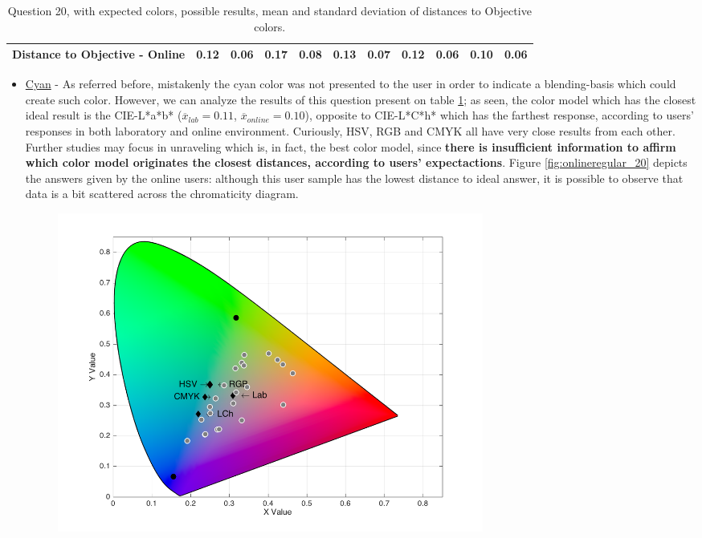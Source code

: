 \begin{table}[!htbp]
{\begin{tabular}{lccccccccccccc}
    \multicolumn{4}{l|}{Distance to Objective - Online}                                                                                                                & 0.12                  & \multicolumn{1}{c|}{0.06}          & 0.17                  & \multicolumn{1}{c|}{0.08}          & 0.13                 & \multicolumn{1}{c|}{0.07}          & 0.12                 & \multicolumn{1}{c|}{0.06}          & \textbf{0.10}         & \multicolumn{1}{c|}{0.06}         \\ \hline
  \end{tabular}}
  \caption[Question 20, with expected Results.]{Question 20, with expected colors, possible results, mean and standard deviation of distances to Objective colors.}
  \label{table:lab_q20_expected}
\end{table}
%
\begin{itemize}
  \item \ul{Cyan} - As referred before, mistakenly the cyan color was not presented to the user in order to indicate a blending-basis which could create such color. However, we can analyze the results of
  this question present on table \ref{table:lab_q20_expected}; as seen, the color model which has the closest ideal result is the CIE-L*a*b* ($\overline{x}_{lab} = 0.11$, $\overline{x}_{online} = 0.10$), opposite
  to CIE-L*C*h* which has the farthest response, according to users' responses in both laboratory and online environment. Curiously, HSV, RGB and CMYK all have very close results from each other. Further
  studies may focus in unraveling which is, in fact, the best color model, since \textbf{there is insufficient information to affirm which color model originates the closest distances, according to users'
  expectactions}. Figure \ref{fig:onlineregular_20} depicts the answers given by the online users: although this user sample has the lowest distance to ideal answer, it is possible to observe that data is
  a bit scattered across the chromaticity diagram.
  \begin{figure}[!htbp]
    \centering
    \includegraphics[width=0.7\textwidth]{images/results/20_online_regularUsers.png}

\end{figure}
\end{itemize}
